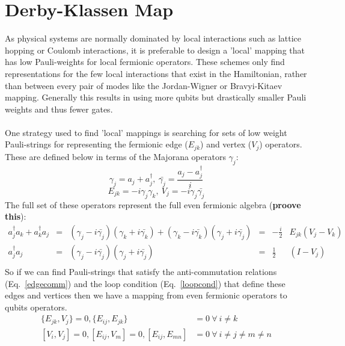 \documentclass[twoside]{article}
\begin{document}
\section{Derby-Klassen Map}\label{derby-klassen_section}
As physical systems are normally dominated by local interactions such as lattice hopping or Coulomb interactions, it is preferable to design a 'local' mapping that has low Pauli-weights for local fermionic operators. These schemes only find representations for the few local interactions that exist in the Hamiltonian, rather than between every pair of modes like the Jordan-Wigner or Bravyi-Kitaev mapping. Generally this results in using more qubits but drastically smaller Pauli weights and thus fewer gates.\\\\
One strategy used to find 'local' mappings is searching for sets of low weight Pauli-strings for representing the fermionic edge ($E_{jk}$) and vertex ($V_j$) operators. These are defined below in terms of the Majorana operators $\gamma_j$:
\begin{equation}
\gamma_j = a_j + a^{\dagger}_j, \> \bar{\gamma_j} = \frac{a_j - a_j^{\dagger}}{i}
\end{equation}
\begin{equation}
        E_{jk} = - i \gamma_j \gamma_k, \> V_j = - i \gamma_j \bar{\gamma_j}
\end{equation}
The full set of these operators represent the full even fermionic algebra \cite{superfast} (\textbf{proove this}):
\begin{equation}
        \begin{align}
                a_j^{\dagger} a_k + a_k^{\dagger} a_j &=& (\gamma_j - i \bar{\gamma_j}) (\gamma_k + i \bar{\gamma_k})  + (\gamma_k - i \bar{\gamma_k}) (\gamma_j + i \bar{\gamma_j}) &=& -\frac{i}{2}& E_{jk} (V_j - V_k)\\
                a_j^{\dagger} a_j &=& (\gamma_j - i \bar{\gamma_j}) (\gamma_j + i \bar{\gamma_j}) &=&  \frac{1}{2}& (I - V_j)\\
\end{align}
\end{equation}
So if we can find Pauli-strings that satisfy the anti-commutation relations (Eq.~\ref{edgecomm}) \cite{derbyklassen} and the loop condition (Eq.~\ref{loopcond}) that define these edges and vertices then we have a mapping from even fermionic operators to qubits operators. 
\begin{equation}
        \label{edgecomm}
        \begin{align}
                \{ E_{jk}, V_j\} = 0, \{ E_{ij}, E_{jk} \} &= 0 \> \forall \>i \neq k\\
                [V_i, V_j] =0, [E_{ij}, V_m] = 0, [E_{ij}, E_{mn}] &= 0 \>\forall \>i \neq j \neq m \neq n
\end{align}
\end{equation}
\end{document}
